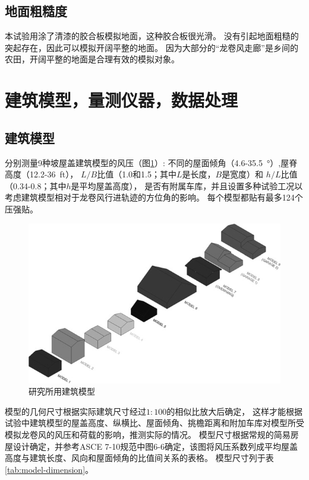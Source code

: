 \documentclass{ctexart}
\begin{document}
\subsection{地面粗糙度}
本试验用涂了清漆的胶合板模拟地面，这种胶合板很光滑。
没有引起地面粗糙的突起存在，因此可以模拟开阔平整的地面。
因为大部分的“龙卷风走廊”是乡间的农田，开阔平整的地面是合理有效的模拟对象。

\section{建筑模型，量测仪器，数据处理}
\subsection{建筑模型}
分别测量9种坡屋盖建筑模型的风压（图\ref{fig:building-models}）:
不同的屋面倾角（\num{4.6}-\SI{35.5}{\degree}）,屋脊高度（\num{12.2}-\SI{36}{ft}），
$L/B$比值（\num{1.0}和\num{1.5}；其中$L$是长度，$B$是宽度）和
$h/L$比值（\num{0.34}-\num{0.8}；其中$h$是平均屋盖高度），
是否有附属车库，并且设置多种试验工况以考虑建筑模型相对于龙卷风行进轨迹的方位角的影响。
每个模型都贴有最多\num{124}个压强贴。

\begin{figure}
\centering
\includegraphics{./fig/2}
\caption{研究所用建筑模型}
\label{fig:building-models}
\end{figure}


模型的几何尺寸根据实际建筑尺寸经过$1:100$的相似比放大后确定，
这样才能根据试验中建筑模型的屋盖高度、纵横比、屋面倾角、挑檐距离和附加车库对模型所受模拟龙卷风的风压和荷载的影响，推测实际的情况。
模型尺寸根据常规的简易房屋设计确定，并参考ASCE 7-10规范中图6-6确定，该图将风压系数列成平均屋盖高度与建筑长度、风向和屋面倾角的比值间关系的表格。
模型尺寸列于表\ref{tab:model-dimension}。
\end{document}
